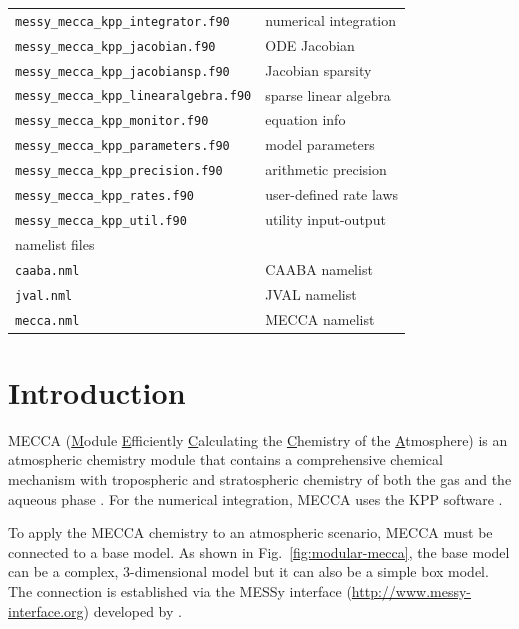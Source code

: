 \documentclass[twoside]{article}
\newcommand{\egcite}[1]{\citep[e.g.][]{#1}}
\begin{document}
\begin{table}[htb]
\begin{center}
\begin{tabular}{lp{}}
      \verb|messy_mecca_kpp_integrator.f90|    & numerical integration\\
      \verb|messy_mecca_kpp_jacobian.f90|      & ODE Jacobian\\
      \verb|messy_mecca_kpp_jacobiansp.f90|    & Jacobian sparsity\\
      \verb|messy_mecca_kpp_linearalgebra.f90| & sparse linear algebra\\
      \verb|messy_mecca_kpp_monitor.f90|       & equation info\\
      \verb|messy_mecca_kpp_parameters.f90|    & model parameters\\
      \verb|messy_mecca_kpp_precision.f90|     & arithmetic precision\\
      \verb|messy_mecca_kpp_rates.f90|         & user-defined rate laws\\
      \verb|messy_mecca_kpp_util.f90|          & utility input-output\\
      \hline
      \multicolumn{2}{l}{namelist files}\\
      \hline
      \verb|caaba.nml|                         & CAABA namelist\\
      \verb|jval.nml|                          & JVAL namelist\\
      \verb|mecca.nml|                         & MECCA namelist\\
      \hline
    \end{tabular}
  \end{center}
\end{table}

\section{Introduction}

MECCA (\underline{M}odule \underline{E}fficiently
\underline{C}alculating the \underline{C}hemistry of the
\underline{A}tmosphere) is an atmospheric chemistry module that contains
a comprehensive chemical mechanism with tropospheric and stratospheric
chemistry of both the gas and the aqueous phase \citep{1666}. For the
numerical integration, MECCA uses the KPP software \citep{1665}.

To apply the MECCA chemistry to an atmospheric scenario, MECCA must be
connected to a base model. As shown in Fig.~\ref{fig:modular-mecca}, the
base model can be a complex, 3-dimensional model \egcite{1851} but it
can also be a simple box model. The connection is established via the
MESSy interface (\url{http://www.messy-interface.org}) developed by
\citet{1664}.
\end{document}
